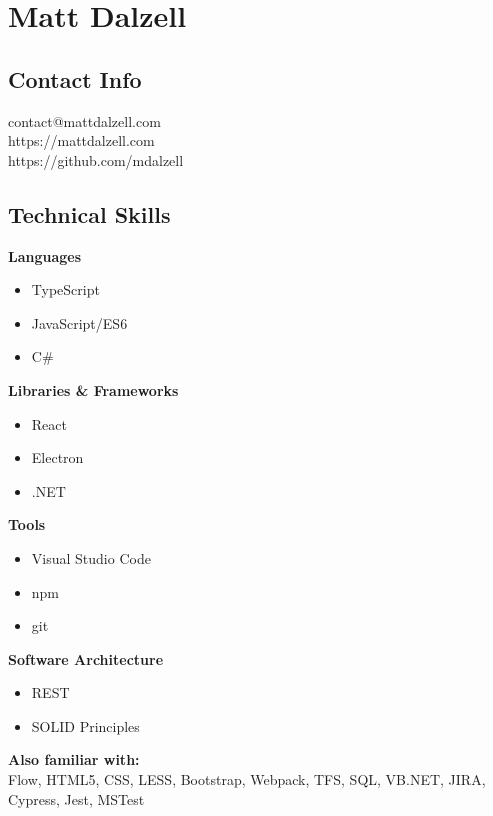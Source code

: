 \documentclass[12pt]{article}
\begin{document}

\section*{Matt Dalzell}

\setlength{\columnsep}{4em}
\setlength{\columnseprule}{0.1pt}
\begin{paracol}{2}

\subsection*{Contact Info}
contact@mattdalzell.com \\ 
https://mattdalzell.com \\
https://github.com/mdalzell

\subsection*{Technical Skills} 

\textbf{Languages}
\begin{itemize}
    \item TypeScript 
    \item JavaScript/ES6
    \item C\#
\end{itemize}

\noindent \textbf{Libraries \& Frameworks}
\begin{itemize}
    \item React 
    \item Electron
    \item .NET 
\end{itemize}

\noindent \textbf{Tools}
\begin{itemize}
    \item Visual Studio Code
    \item npm
    \item git
\end{itemize}

\noindent \textbf{Software Architecture}
\begin{itemize}
    \item REST
    \item SOLID Principles
\end{itemize}

\noindent \textbf{Also familiar with:}\\
Flow, HTML5, CSS, LESS, Bootstrap, Webpack, TFS, SQL, VB.NET, JIRA, Cypress, Jest, MSTest


\end{paracol}
\end{document}
